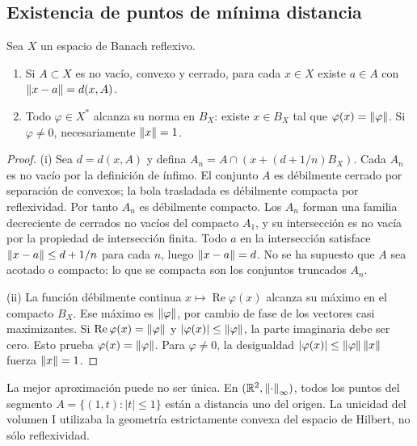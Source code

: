 \subsection{Existencia de puntos de mínima distancia}
\begin{teorema}\label{v3:proximinal-reflexivo}
Sea $X$ un espacio de Banach reflexivo.
\begin{enumerate}
\item Si $A\subset X$ es no vacío, convexo y cerrado, para cada $x\in X$ existe $a\in A$ con $\left\lVert x-a\right\rVert=d(x,A)$.
\item Todo $\varphi\in X^*$ alcanza su norma en $B_X$: existe $x\in B_X$ tal que $\varphi(x)=\left\lVert\varphi\right\rVert$. Si $\varphi\ne0$, necesariamente $\left\lVert x\right\rVert=1$.
\end{enumerate}
\end{teorema}
\begin{proof}
(i) Sea $d=d(x,A)$ y defina $A_n=A\cap(x+(d+1/n)B_X)$. Cada $A_n$ es no vacío por la definición de ínfimo. El conjunto $A$ es débilmente cerrado por separación de convexos; la bola trasladada es débilmente compacta por reflexividad. Por tanto $A_n$ es débilmente compacto. Los $A_n$ forman una familia decreciente de cerrados no vacíos del compacto $A_1$, y su intersección es no vacía por la propiedad de intersección finita. Todo $a$ en la intersección satisface $\left\lVert x-a\right\rVert\leq d+1/n$ para cada $n$, luego $\left\lVert x-a\right\rVert=d$. No se ha supuesto que $A$ sea acotado o compacto: lo que se compacta son los conjuntos truncados $A_n$.

(ii) La función débilmente continua $x\mapsto\operatorname{Re}\varphi(x)$ alcanza su máximo en el compacto $B_X$. Ese máximo es $\left\lVert\varphi\right\rVert$, por cambio de fase de los vectores casi maximizantes. Si $\operatorname{Re}\varphi(x)=\left\lVert\varphi\right\rVert$ y $|\varphi(x)|\leq\left\lVert\varphi\right\rVert$, la parte imaginaria debe ser cero. Esto prueba $\varphi(x)=\left\lVert\varphi\right\rVert$. Para $\varphi\ne0$, la desigualdad $|\varphi(x)|\leq\left\lVert\varphi\right\rVert\left\lVert x\right\rVert$ fuerza $\left\lVert x\right\rVert=1$.
\end{proof}
La mejor aproximación puede no ser única. En $(\mathbb R^2,\left\lVert\cdot\right\rVert_\infty)$, todos los puntos del segmento $A=\{(1,t):|t|\leq1\}$ están a distancia uno del origen. La unicidad del volumen I utilizaba la geometría estrictamente convexa del espacio de Hilbert, no sólo reflexividad.

